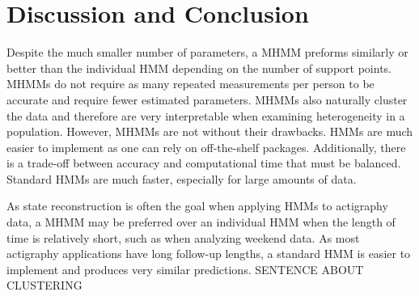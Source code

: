 \documentclass{article}
\begin{document}
\section{Discussion and Conclusion}

Despite the much smaller number of parameters, a MHMM preforms similarly or better than the individual HMM depending on the number of support points. MHMMs do not require as many repeated measurements per person to be accurate and require fewer estimated parameters. MHMMs also naturally cluster the data and therefore are very interpretable when examining heterogeneity in a population. However, MHMMs are not without their drawbacks. HMMs are much easier to implement as one can rely on off-the-shelf packages. Additionally, there is a trade-off between accuracy and computational time that must be balanced. Standard HMMs are much faster, especially for large amounts of data. 

As state reconstruction is often the goal when applying HMMs to actigraphy data, a MHMM may be preferred over an individual HMM when the length of time is relatively short, such as when analyzing weekend data. As most actigraphy applications have long follow-up lengths, a standard HMM is easier to implement and produces very similar predictions. SENTENCE ABOUT CLUSTERING



\end{document}

